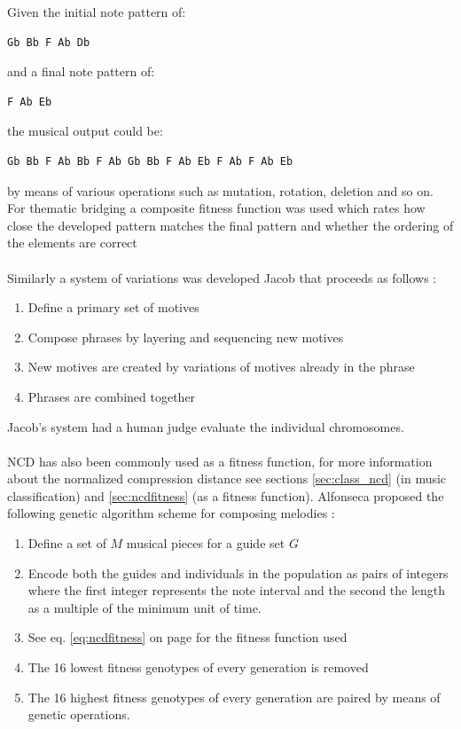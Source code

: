 Given the initial note pattern of:
 \begin{verbatim}Gb Bb F Ab Db \end{verbatim}
and a final note pattern of:
\begin{verbatim}F Ab Eb \end{verbatim}
the musical output could be:
\begin{verbatim}Gb Bb F Ab Bb F Ab Gb Bb F Ab Eb F Ab F Ab Eb \end{verbatim} by means of various operations such as mutation, rotation, deletion and so on.
For thematic bridging a composite fitness function was used which rates how close the developed pattern matches the final pattern and whether the ordering of the elements are correct 
\\
\\
Similarly a system of variations was developed Jacob that proceeds as follows \cite{Jacob1995}:
\begin{enumerate}
\item Define a primary set of motives
\item Compose phrases by layering and sequencing new motives
\item New motives are created by variations of motives already in the phrase
\item Phrases are combined together
\end{enumerate}
Jacob's system had a human judge evaluate the individual chromosomes. 
\\
\\
\ac{NCD} has also been commonly used as a fitness function, for more information about the normalized compression distance see sections \ref{sec:class_ncd} (in music classification) and \ref{sec:ncdfitness} (as a fitness function).
Alfonseca proposed the following genetic algorithm scheme for composing melodies \cite{Alfonseca2007}:
\begin{enumerate}
\item Define a set of $M$ musical pieces for a guide set $G$
\item Encode both the guides and individuals in the population as pairs of integers where the first integer represents the note interval and the second the length as a multiple of the minimum unit of time.
\item See eq. \ref{eq:ncdfitness} on page \pageref{eq:ncdfitness} for the fitness function used
\item The 16 lowest fitness genotypes of every generation is removed
\item The 16 highest fitness genotypes of every generation are paired by means of genetic operations.
\end{enumerate}


